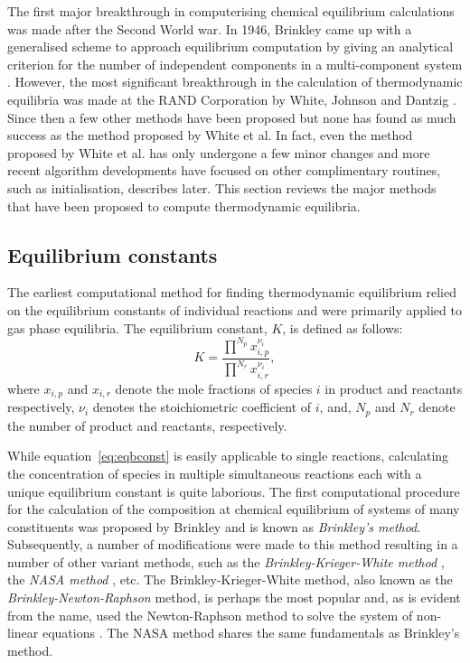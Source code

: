 	The first major breakthrough in computerising chemical equilibrium calculations was made after the Second World war. In 1946, Brinkley came up with a generalised scheme to approach equilibrium computation by giving an analytical criterion for the number of independent components in a multi-component system \cite{vanZeggeren11}. However, the most significant breakthrough in the calculation of thermodynamic equilibria was made at the RAND Corporation by White, Johnson and Dantzig  \cite{White:58}. Since then a few other methods have been proposed but none has found as much success as the method proposed by White et al. In fact, even the method proposed by White et al. has only undergone a few minor changes and more recent algorithm developments have focused on other complimentary routines, such as initialisation, describes later. This section reviews the major methods that have been proposed to compute thermodynamic equilibria.

	\subsection{Equilibrium constants}
	The earliest computational method for finding thermodynamic equilibrium relied on the equilibrium constants of individual reactions and were primarily applied to gas phase equilibria. The equilibrium constant, $K$, is defined as follows:
	\begin{equation}\label{eq:eqbconst}
		K = \frac{\prod^{N_p} x_{i,p}^{\nu_i}}{\prod^{N_r} x_{i,r}^{\nu_i}},
	\end{equation}
	where $x_{i,p}$ and $x_{i,r}$ denote the mole fractions of species $i$ in product and reactants respectively, $\nu_i$ denotes the stoichiometric coefficient of $i$, and, $N_p$ and $N_r$ denote the number of product and reactants, respectively.

	While equation~\eqref{eq:eqbconst} is easily applicable to single reactions, calculating the concentration of species in multiple simultaneous reactions each with a unique equilibrium constant is quite laborious. The first computational procedure for the calculation of the composition at chemical equilibrium of systems of many constituents was proposed by Brinkley \cite{Brinkley:1947aa} and is known as \emph{Brinkley's method}. Subsequently, a number of modifications were made to this method resulting in a number of other variant methods, such as the \emph{Brinkley-Krieger-White method} \cite{Krieger:1948aa}, the \emph{NASA method} \cite{Zeleznik:1968aa}, etc. The Brinkley-Krieger-White method, also known as the \emph{Brinkley-Newton-Raphson} method, is perhaps the most popular and, as is evident from the name, used the Newton-Raphson method to solve the system of non-linear equations \cite{vanZeggeren11}. The NASA method \cite{Zeleznik:1968aa} shares the same fundamentals as Brinkley's method.

